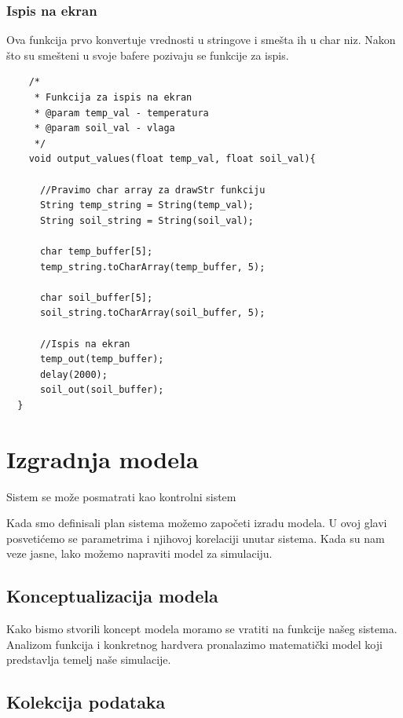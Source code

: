 \documentclass[a4paper,11pt]{book}
\begin{document}
  
    \subsection{Ispis na ekran}

    Ova funkcija prvo konvertuje vrednosti u stringove i smešta ih u char niz. Nakon što su smešteni u svoje bafere pozivaju se funkcije za ispis.

    
  \begin{lstlisting}
    /*
     * Funkcija za ispis na ekran
     * @param temp_val - temperatura
     * @param soil_val - vlaga
     */
    void output_values(float temp_val, float soil_val){

	  //Pravimo char array za drawStr funkciju
	  String temp_string = String(temp_val);
	  String soil_string = String(soil_val);

	  char temp_buffer[5];
	  temp_string.toCharArray(temp_buffer, 5);

	  char soil_buffer[5];
	  soil_string.toCharArray(soil_buffer, 5);

	  //Ispis na ekran
	  temp_out(temp_buffer);
	  delay(2000);
	  soil_out(soil_buffer);  
  }
    \end{lstlisting}


\chapter{Izgradnja modela}

Sistem se može posmatrati kao kontrolni sistem

Kada smo definisali plan sistema možemo započeti izradu modela. U ovoj glavi posvetićemo se parametrima i njihovoj korelaciji unutar sistema. Kada su nam veze jasne, lako možemo napraviti model za simulaciju.

\section{Konceptualizacija modela}

Kako bismo stvorili koncept modela moramo se vratiti na funkcije našeg sistema. Analizom funkcija i konkretnog hardvera pronalazimo matematički model koji predstavlja temelj naše simulacije.\\




\section{Kolekcija podataka}
\end{document}
